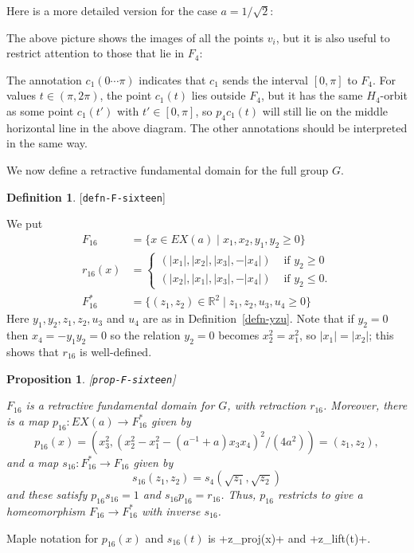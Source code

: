 \documentclass[reqno]{amsart}
\newcommand{\lbl}[1]{\label{#1}\textup{[\texttt{#1}]}\par}
\newcommand{\lbl}{\label}
\newcommand{\R}         {{\mathbb{R}}}
\newcommand{\st}        {\;|\;}
\newcommand{\rt}        {\sqrt{2}}
\renewcommand{\:}{\colon}
\newtheorem{proposition}[theorem]{Proposition}
\theoremstyle{definition}
\newtheorem{definition}[theorem]{Definition}
\begin{document}
Here is a more detailed version for the case $a=1/\rt$:

The above picture shows the images of all the points $v_i$, but it is
also useful to restrict attention to those that lie in $F_4$:

The annotation $c_1(0\dotsb\pi)$ indicates that $c_1$ sends the
interval $[0,\pi]$ to $F_4$.  For values $t\in(\pi,2\pi)$, the
point $c_1(t)$ lies outside $F_4$, but it has the same $H_4$-orbit as
some point $c_1(t')$ with $t'\in[0,\pi]$, so $p_4c_1(t)$ will still
lie on the middle horizontal line in the above diagram.  The other
annotations should be interpreted in the same way.

We now define a retractive fundamental domain for the full group $G$.
\begin{definition}\lbl{defn-F-sixteen}
 We put
 \begin{align*}
  F_{16} &= \{x\in EX(a) \st x_1,x_2,y_1,y_2\geq 0\} \\
  r_{16}(x) &=
   \begin{cases}
    (|x_1|,|x_2|,|x_3|,-|x_4|) & \text{ if } y_2\geq 0 \\
    (|x_2|,|x_1|,|x_3|,-|x_4|) & \text{ if } y_2\leq 0.
   \end{cases} \\
  F_{16}^* &= \{(z_1,z_2)\in\R^2\st z_1,z_2,u_3,u_4\geq 0\}
 \end{align*}
 Here $y_1,y_2,z_1,z_2,u_3$ and $u_4$ are as in
 Definition~\ref{defn-yzu}.  Note that if $y_2=0$ then
 $x_4=-y_1y_2=0$ so the relation $y_2=0$ becomes $x_2^2=x_1^2$, so
 $|x_1|=|x_2|$; this shows that $r_{16}$ is well-defined.
\end{definition}
\begin{proposition}\lbl{prop-F-sixteen}
 $F_{16}$ is a retractive fundamental domain for $G$, with retraction
 $r_{16}$.  Moreover, there is a map $p_{16}\:EX(a)\to F_{16}^*$ given by
 \[ p_{16}(x) = (x_3^2,(x_2^2 - x_1^2 - (a^{-1}+a)x_3x_4)^2/(4a^2))
              = (z_1,z_2),
 \]
 and a map $s_{16}\:F_{16}^*\to F_{16}$ given by
 \[ s_{16}(z_1,z_2) = s_4(\sqrt{z_1},\sqrt{z_2}) \]
 and these satisfy $p_{16}s_{16}=1$ and $s_{16}p_{16}=r_{16}$.  Thus,
 $p_{16}$ restricts to give a homeomorphism $F_{16}\to F_{16}^*$ with
 inverse $s_{16}$.
\end{proposition}
Maple notation for $p_{16}(x)$ and $s_{16}(t)$ is \mcode+z_proj(x)+ and
\mcode+z_lift(t)+.
\end{document}
